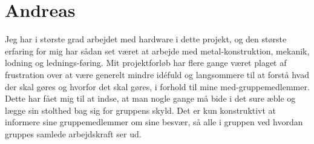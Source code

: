 \section{Andreas}

Jeg har i største grad arbejdet med hardware i dette projekt, og den største erfaring for mig har sådan set været at arbejde med metal-konstruktion, mekanik, lodning og lednings-føring. Mit projektforløb har flere gange været plaget af frustration over at være generelt mindre idéfuld og langsommere til at forstå hvad der skal gøres og hvorfor det skal gøres, i forhold til mine med-gruppemedlemmer. Dette har fået mig til at indse, at man nogle gange må bide i det sure æble og lægge sin stolthed bag sig for gruppens skyld. Det er kun konstruktivt at informere sine gruppemedlemmer om sine besvær, så alle i gruppen ved hvordan gruppes samlede arbejdskraft ser ud.